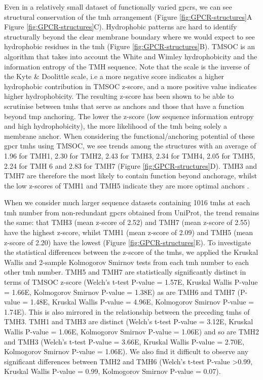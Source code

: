 Even in a relatively small dataset of functionally varied \gls{gpcr}s, we can see structural conservation of the \gls{tmh} arrangement (Figure \ref{fig:GPCR-structures}A Figure \ref{fig:GPCR-structures}C).
Hydrophobic patterns are hard to identify structurally beyond the clear membrane boundary where we would expect to see hydrophobic residues in the \gls{tmh} (Figure \ref{fig:GPCR-structures}B).
TMSOC \cite{Wong2011, Wong2012} is an algorithm that takes into account the White and Wimley hydrophobicity \cite{White1999} and the information entropy of the TMH sequence.
Note that the scale is the inverse of the Kyte \& Doolittle scale, i.e a more negative score indicates a higher hydrophobic contribution in TMSOC z\--score, and a more positive value indicates higher hydrophobicity.
The resulting z\--score has been shown to be able to scrutinise between \gls{tmh}s that serve as anchors and those that have a function beyond \gls{tmp} anchoring.
The lower the z\--score (low sequence information entropy and high hydrophobicity), the more likelihood of the \gls{tmh} being solely a membrane anchor.
When considering the functional/anchoring potential of these \gls{gpcr} \gls{tmh}s  using TMSOC, we see trends among the structures with an average of 1.96 for TMH1, 2.30 for TMH2, 2.43 for TMH3, 2.34 for TMH4, 2.05 for TMH5, 2.24 for TMH 6 and 2.83 for TMH7 (Figure \ref{fig:GPCR-structures}D).
TMH3 and TMH7 are therefore the most likely to contain function beyond anchorage, whilst the low z\--scores of TMH1 and TMH5 indicate they are more optimal anchors \cite{Baker2017}.

When we consider much larger sequence datasets containing 1016 \gls{tmh}s at each \gls{tmh} number from non-redundant \gls{gpcr}s obtained from UniProt, the trend remains the same: that TMH3 (mean z\--score of 2.52) and TMH7 (mean z\--score of 2.55) have the highest z\--score, whilst TMH1 (mean z\--score of 2.09) and TMH5 (mean z\--score of 2.20) have the lowest (Figure \ref{fig:GPCR-structures}E).
To investigate the statistical differences between the z\--score of the \gls{tmh}s, we applied the Kruskal Wallis and 2-sample Kolmogorov Smirnov tests from each \gls{tmh} number to each other \gls{tmh} number.
TMH5 and TMH7 are statistically significantly distinct in terms of TMSOC z\--score (Welch's t-test P\--value = 1.57E, Kruskal Wallis P\--value = 1.66E, Kolmogorov Smirnov P\--value = 1.38E) as are TMH6 and TMH7 (P\--value = 1.48E, Kruskal Wallis P\--value = 4.96E, Kolmogorov Smirnov P\--value = 1.74E).
This is also mirrored in the relationship between the preceding \gls{tmh}s of TMH3.
TMH1 and TMH3 are distinct (Welch's t-test P\--value = 3.12E, Kruskal Wallis P\--value = 1.06E, Kolmogorov Smirnov P\--value = 1.06E) and so are TMH2 and TMH3 (Welch's t-test P\--value = 3.66E, Kruskal Wallis P\--value = 2.70E, Kolmogorov Smirnov P\--value = 1.06E).
We also find it difficult to observe any significant differences between TMH2 and TMH6 (Welch's t\--test P\--value \textgreater 0.99, Kruskal Wallis P\--value = 0.99, Kolmogorov Smirnov P\--value = 0.07).

